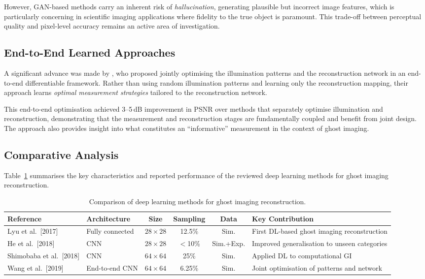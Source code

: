 However, GAN-based methods carry an inherent risk of \emph{hallucination}, generating plausible but incorrect image features, which is particularly concerning in scientific imaging applications where fidelity to the true object is paramount. This trade-off between perceptual quality and pixel-level accuracy remains an active area of investigation.

\subsection{End-to-End Learned Approaches}

A significant advance was made by \citet{wang2019}, who proposed jointly optimising the illumination patterns and the reconstruction network in an end-to-end differentiable framework. Rather than using random illumination patterns and learning only the reconstruction mapping, their approach learns \emph{optimal measurement strategies} tailored to the reconstruction network.

This end-to-end optimisation achieved 3--5\,dB improvement in PSNR over methods that separately optimise illumination and reconstruction, demonstrating that the measurement and reconstruction stages are fundamentally coupled and benefit from joint design. The approach also provides insight into what constitutes an ``informative'' measurement in the context of ghost imaging.

\subsection{Comparative Analysis}

Table~\ref{tab:gi_comparison} summarises the key characteristics and reported performance of the reviewed deep learning methods for ghost imaging reconstruction.

\begin{table}[t]
\centering
\footnotesize
\caption{Comparison of deep learning methods for ghost imaging reconstruction.}
\label{tab:gi_comparison}
\begin{tabular}{@{}lp{2.2cm}cccl@{}}
\toprule
\textbf{Reference} & \textbf{Architecture} & \textbf{Size} & \textbf{Sampling} & \textbf{Data} & \textbf{Key Contribution} \\
\midrule
Lyu et al.\ [2017]       & Fully connected  & $28\times28$   & 12.5\%  & Sim.     & First DL-based ghost imaging reconstruction \\
He et al.\ [2018]        & CNN              & $28\times28$   & $<$10\% & Sim.+Exp. & Improved generalisation to unseen categories \\
Shimobaba et al.\ [2018] & CNN              & $64\times64$   & 25\%    & Sim.     & Applied DL to computational GI \\
Wang et al.\ [2019]      & End-to-end CNN   & $64\times64$   & 6.25\%  & Sim.     & Joint optimisation of patterns and network \\
\bottomrule
\end{tabular}
\end{table}

